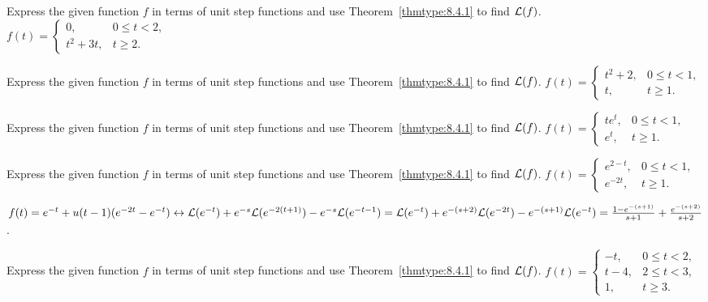 \documentclass{ximera}
\begin{document}
\begin{problem}\label{exer:8.4.7}
Express the
given function $f$ in terms of unit step functions
 and use Theorem~\ref{thmtype:8.4.1} to find ${\cal L}(f)$.
$f(t)=\left\{\begin{array}{cl} 0, &0\le
t<2,\\ t^2+3t,&t\ge2.\end{array}\right.$
\end{problem}

 \begin{problem}\label{exer:8.4.8}
Express the
given function $f$ in terms of unit step functions
 and use Theorem~\ref{thmtype:8.4.1} to find ${\cal L}(f)$.
 $f(t)=\left\{\begin{array}{cl} t^2+2, &0\le
t<1,\\ t,&t\ge1.\end{array}\right.$
\end{problem}


 \begin{problem}\label{exer:8.4.9}
Express the
given function $f$ in terms of unit step functions
 and use Theorem~\ref{thmtype:8.4.1} to find ${\cal L}(f)$.
 $f(t)=\left\{\begin{array}{cl} te^t,& 0\le t
<1,\\ e^t,&t\ge1.\end{array}\right.$
\end{problem}

\begin{problem}\label{exer:8.4.10} 
Express the
given function $f$ in terms of unit step functions
 and use Theorem~\ref{thmtype:8.4.1} to find ${\cal L}(f)$.
$f(t)=\left\{\begin{array}{cl}
e^{2-t}, &0\le t<1,\\ 
e^{-2t},&t\ge1.\end{array}\right.$

\begin{solution}
$f(t)=e^{-t}+u(t-1)(e^{-2t}-e^{-t})
\leftrightarrow {\cal L}(e^{-t})+e^{-s}{\cal
L}(e^{-2(t+1)})-e^{-s}{\cal L}(e^{-t-1})=
 {\cal L}(e^{-t})+e^{-(s+2)}{\cal
L}(e^{-2t})-e^{-(s+1)}{\cal L}(e^{-t})=
\frac{1-e^{-(s+1)}}{s+1}+\frac{e^{-(s+2)}}{s+2}$.
\end{solution}
\end{problem}

\begin{problem}\label{exer:8.4.11}
Express the
given function $f$ in terms of unit step functions
 and use Theorem~\ref{thmtype:8.4.1} to find ${\cal L}(f)$. 
$f(t)=\left\{\begin{array}{cl} -t,&0 \le
t<2,\\ t-4,&2\le t<3,\\ 1,&t\ge3.
\end{array}\right.$
\end{problem}
\end{document}
